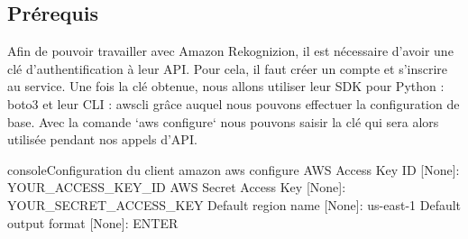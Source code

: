 \subsection{Prérequis}

Afin de pouvoir travailler avec Amazon Rekognizion, il est nécessaire d’avoir une clé d’authentification à leur API.
Pour cela, il faut créer un compte et s’inscrire au service. Une fois la clé obtenue, nous allons utiliser leur SDK pour
Python : boto3  et leur CLI : awscli grâce auquel nous pouvons effectuer la configuration de base.
Avec la comande `aws configure` nous pouvons saisir la clé qui sera alors utilisée pendant nos appels d’API.

\begin{listingsbox}{console}{Configuration du client amazon}
aws configure
AWS Access Key ID [None]:  YOUR_ACCESS_KEY_ID
AWS Secret Access Key [None]: YOUR_SECRET_ACCESS_KEY
Default region name [None]: us-east-1
Default output format [None]: ENTER
\end{listingsbox}